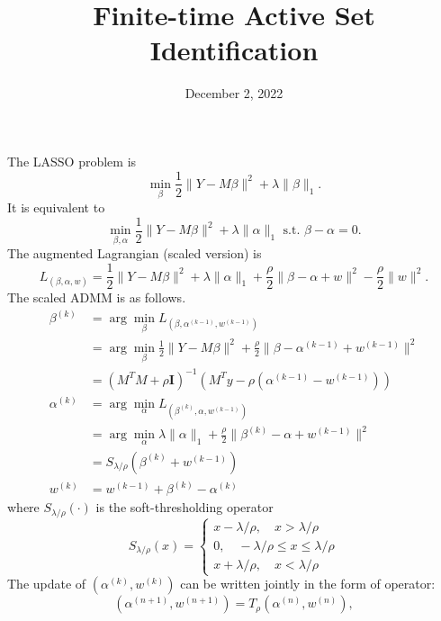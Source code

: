 \documentclass{article}
\title{Finite-time Active Set Identification}
\date{December 2, 2022}
\begin{document}
\maketitle
The LASSO problem is
\begin{equation}
    \min_{\beta}\frac{1}{2}\|Y-M\beta\|^2 +\lambda\|\beta\|_1.
\end{equation}
It is equivalent to 
\begin{equation}
    \min_{\beta, \alpha}\frac{1}{2}\|Y-M\beta\|^2 +\lambda\|\alpha\|_1\text{ s.t. }\beta-\alpha=0.
\end{equation}
The augmented Lagrangian (scaled version) is
\begin{equation}
    L_(\beta, \alpha, w) = \frac{1}{2}\|Y-M\beta\|^2 +\lambda\|\alpha\|_1 + \frac{\rho}{2}\|\beta-\alpha+w\|^2 - \frac{\rho}{2}\|w\|^2.
\end{equation}
The scaled ADMM is as follows.
\begin{equation}
\begin{aligned}
    \beta^{(k)} &= \arg\min_{\beta}L_(\beta, \alpha^{(k-1)}, w^{(k-1)})\\
    &= \arg\min_{\beta} \frac{1}{2}\|Y-M\beta\|^2+ \frac{\rho}{2}\|\beta-\alpha^{(k-1)}+w^{(k-1)}\|^2\\
    &= (M^TM+\rho \mathbf{I})^{-1}\left(M^Ty - \rho(\alpha^{(k-1)}-w^{(k-1)})\right)\\
    \alpha^{(k)} &= \arg\min_{\alpha}L_(\beta^{(k)}, \alpha, w^{(k-1)})\\
    &=\arg\min_{\alpha}\lambda\|\alpha\|_1 + \frac{\rho}{2}\|\beta^{(k)}-\alpha+w^{(k-1)}\|^2\\
    & = S_{\lambda/\rho}(\beta^{(k)}+w^{(k-1)})\\
    w^{(k)} &= w^{(k-1)}+\beta^{(k)}-\alpha^{(k)}
    \end{aligned}    
\end{equation}
where $S_{\lambda/\rho}(\cdot)$ is the soft-thresholding operator
\begin{equation}
S_{\lambda/\rho}(x) = \left\{\begin{array}{l}
x - \lambda/\rho, \quad x>\lambda/\rho\\
0,\quad -\lambda/\rho\leq x \leq \lambda/\rho\\
x + \lambda/\rho,\quad x<\lambda/\rho
\end{array}\right.    
\end{equation}
The update of $(\alpha^{(k)}, w^{(k)})$ can be written jointly in the form of operator:
\begin{equation}
    (\alpha^{(n+1)}, w^{(n+1)}) = T_{\rho}(\alpha^{(n)}, w^{(n)}),
\end{equation}
\end{document}

